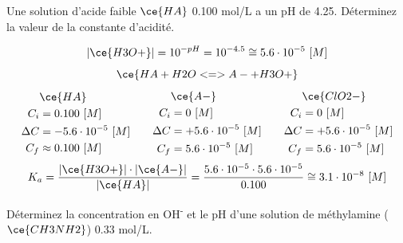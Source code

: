 \documentclass[
  11pt,
  french,
  a4paper,
  openany]{book}
\begin{document}
\begin{Exercise}
Une solution d'acide faible \(\ce{HA}\) 0.100 mol/L a un pH de 4.25. Déterminez la valeur de la constante d'acidité.

\end{Exercise}

\begin{Answer}
\[
|\ce{H3O+}| = 10^{-pH} = 10^{-4.5} \cong 5.6 \cdot 10^{-5}\ [M]
\]
\[
\ce{HA + H2O <=> A- + H3O+}
\]
\[
\begin{split}
&\ce{HA}\\
C_i &= 0.100\ [M] \\
\Delta C &= - 5.6 \cdot 10^{-5}\ [M] \\
C_f &\approx 0.100\ [M] \\
\end{split}
\qquad
\begin{split}
&\ce{A-}\\
C_i &= 0\ [M] \\
\Delta C &= + 5.6 \cdot 10^{-5}\ [M] \\
C_f &= 5.6 \cdot 10^{-5}\ [M] \\
\end{split}
\qquad
\begin{split}
&\ce{ClO2-}\\
C_i &= 0\ [M] \\
\Delta C &= + 5.6 \cdot 10^{-5}\ [M] \\
C_f &= 5.6 \cdot 10^{-5}\ [M] \\
\end{split}
\]
\[
K_a = \frac{|\ce{H3O+}| \cdot |\ce{A-}|}{|\ce{HA}|} = \frac{5.6 \cdot 10^{-5} \cdot 5.6 \cdot 10^{-5}}{0.100} \cong 3.1 \cdot 10^{-8}\ [M]
\]

\end{Answer}

\clearpage

\begin{Exercise}
Déterminez la concentration en OH\textsuperscript{-} et le pH d'une solution de méthylamine (\(\ce{CH3NH2}\)) 0.33 mol/L.

\end{Exercise}
\end{document}
